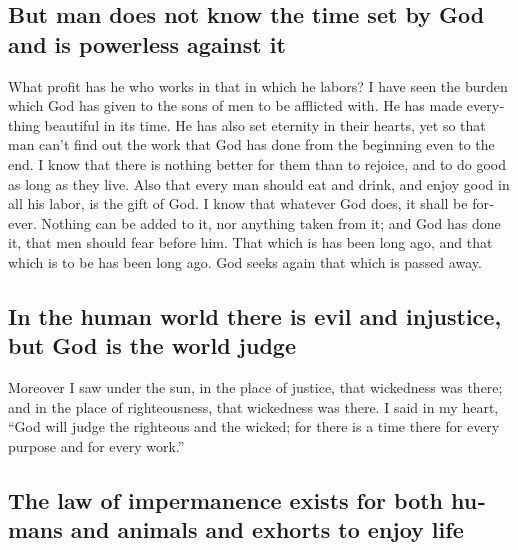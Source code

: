 \begin{paracol}{2}
\begin{otherlanguage}{english}
{\subsection{But man does not know the time set by God and is powerless
against
it}\label{but-man-does-not-know-the-time-set-by-god-and-is-powerless-against-it}}

 What profit has he who works in that in which he labors?
 I have seen the burden which God has given to the sons
of men to be afflicted with.  He has made everything
beautiful in its time. He has also set eternity in their hearts, yet so
that man can't find out the work that God has done from the beginning
even to the end.  I know that there is nothing better for
them than to rejoice, and to do good as long as they live.
 Also that every man should eat and drink, and enjoy good
in all his labor, is the gift of God.  I know that
whatever God does, it shall be forever. Nothing can be added to it, nor
anything taken from it; and God has done it, that men should fear before
him.  That which is has been long ago, and that which is
to be has been long ago. God seeks again that which is passed away.

\hypertarget{in-the-human-world-there-is-evil-and-injustice-but-god-is-the-world-judge}{%
\subsection{In the human world there is evil and injustice, but God is
the world
judge}\label{in-the-human-world-there-is-evil-and-injustice-but-god-is-the-world-judge}}

 Moreover I saw under the sun, in the place of justice,
that wickedness was there; and in the place of righteousness, that
wickedness was there.  I said in my heart, ``God will
judge the righteous and the wicked; for there is a time there for every
purpose and for every work.''

\hypertarget{the-law-of-impermanence-exists-for-both-humans-and-animals-and-exhorts-to-enjoy-life}{%
\subsection{The law of impermanence exists for both humans and animals
and exhorts to enjoy
life}\label{the-law-of-impermanence-exists-for-both-humans-and-animals-and-exhorts-to-enjoy-life}}


\end{otherlanguage}
\end{paracol}

